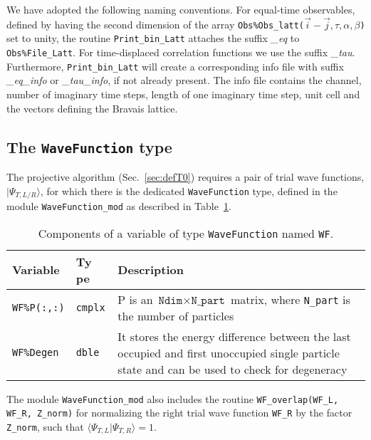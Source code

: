We have adopted the following naming conventions.
For equal-time observables, defined by having the second dimension of the array  \texttt{Obs\%Obs\_latt($\vec{i}-\vec{j},\tau,\alpha,\beta$)}   set to unity, 
the routine \texttt{Print\_bin\_Latt}  attaches the suffix \emph{\_eq} to \texttt{Obs\%File\_Latt}.  For time-displaced correlation functions we use the suffix \emph{\_tau}. 
Furthermore, \texttt{Print\_bin\_Latt} will create a corresponding info file with suffix \emph{\_eq\_info} or \emph{\_tau\_info}, if not already present. The info file contains the channel, number of imaginary time steps, length of one imaginary time step, unit cell and the vectors defining the Bravais lattice.

\subsection{The \texttt{WaveFunction} type} \label{sec:wave_function}

The projective algorithm (Sec.~\ref{sec:defT0}) requires a pair of trial wave functions,  $| \Psi_{T,L/R} \rangle $, for which there is the dedicated  \texttt{WaveFunction} type, defined in the module \texttt{WaveFunction\_mod} as described in Table~\ref{table:wavefunction}.
%
\begin{table}[h!]
	\begin{center}
		\begin{tabular}{@{} p{} p{} p{}  @{}}\toprule
			Variable               & Ty      pe     &  Description \\\midrule
			\texttt{WF\%P(:,:)}    & \texttt{cmplx} &  P is an $\texttt{Ndim}\times\texttt{N\_part}$ matrix, where \texttt{N\_part} is the number of particles\\
			\texttt{WF\%Degen}     & \texttt{dble}  &  It stores the energy difference between the last occupied and first unoccupied single particle state and can be used to check for degeneracy\\\bottomrule
		\end{tabular}
		\caption{Components of a variable of type \texttt{WaveFunction} named \texttt{WF}.}
		\label{table:wavefunction}
	\end{center}
\end{table}
%

The module \texttt{WaveFunction\_mod} also includes the routine \texttt{WF\_overlap(WF\_L, WF\_R, Z\_norm)} for normalizing the right trial wave function \texttt{WF\_R} by the factor \texttt{Z\_norm}, such that $\langle \Psi_{T,L} | \Psi_{T,R} \rangle = 1$.


